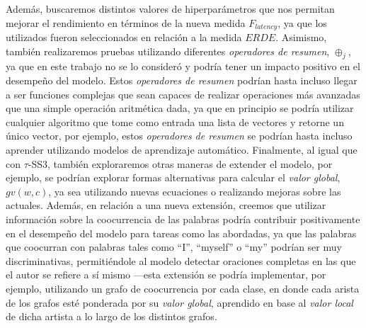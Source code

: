 Además, buscaremos distintos valores de hiperparámetros que nos permitan mejorar el rendimiento en términos de la nueva medida $F_{latency}$, ya que los utilizados fueron seleccionados en relación a la medida $ERDE$. %
Asimismo, también realizaremos pruebas utilizando diferentes \emph{operadores de resumen}, $\oplus_j$, ya que en este trabajo no se lo consideró y podría tener un impacto positivo en el desempeño del modelo. Estos \emph{operadores de resumen} podrían hasta incluso llegar a ser funciones complejas que sean capaces de realizar operaciones más avanzadas que una simple operación aritmética dada, ya que en principio se podría utilizar cualquier algoritmo que tome como entrada una lista de vectores y retorne un único vector, por ejemplo, estos \emph{operadores de resumen} se podrían hasta incluso aprender utilizando modelos de aprendizaje automático.
Finalmente, al igual que con $\tau$-SS3, también exploraremos otras maneras de extender el modelo, por ejemplo, se podrían explorar formas alternativas para calcular el \emph{valor global}, $gv(w,c)$, ya sea utilizando nuevas ecuaciones o realizando mejoras sobre las actuales.
Además, en relación a una nueva extensión, creemos que utilizar información sobre la coocurrencia de las palabras podría contribuir positivamente en el desempeño del modelo para tareas como las abordadas, ya que las palabras que coocurran con palabras tales como ``I'', ``myself'' o ``my'' podrían ser muy discriminativas, permitiéndole al modelo detectar oraciones completas en las que el autor se refiere a sí mismo ---esta extensión se podría implementar, por ejemplo, utilizando un grafo de coocurrencia por cada clase, en donde cada arista de los grafos esté ponderada por su \emph{valor global}, aprendido en base al \emph{valor local} de dicha artista a lo largo de los distintos grafos.

